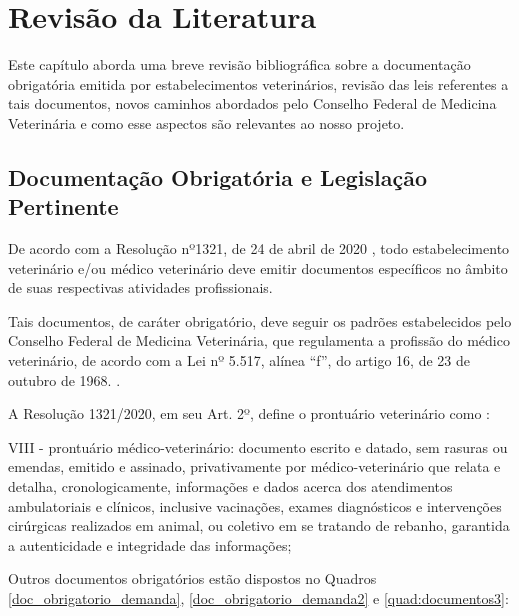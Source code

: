 \documentclass[
    12pt,               %
    openright,          %
    oneside,
    a4paper,            %
    BIBLATEX,           %
    TODO,               %
    english,            %
    brazil              %
    ]{ifsp-spo-inf-ctds}
\begin{document}
\chapter[Revisão de Literatura]{Revisão da Literatura} \label{revisao_lit}

    Este capítulo aborda uma breve revisão bibliográfica sobre a documentação obrigatória emitida por estabelecimentos veterinários, revisão das leis referentes a tais documentos, novos caminhos abordados pelo Conselho Federal de Medicina Veterinária e como esse aspectos são relevantes ao nosso projeto.


    \section{Documentação Obrigatória e Legislação Pertinente}
    
        De acordo com a Resolução nº1321, de 24 de abril de 2020 , todo estabelecimento veterinário e/ou médico veterinário deve emitir documentos específicos no âmbito de suas respectivas atividades profissionais.
        
        Tais documentos, de caráter obrigatório, deve seguir os padrões estabelecidos pelo Conselho Federal de Medicina Veterinária, que regulamenta a profissão do médico veterinário, de acordo com a Lei nº 5.517, alínea “f”, do artigo 16, de 23 de outubro de 1968. .
        
        A Resolução 1321/2020, em seu Art. 2º, define o prontuário veterinário como : 
    
        \begin{citacao}
            
        
            VIII - prontuário médico-veterinário: documento escrito e datado, sem rasuras ou emendas, emitido e assinado, privativamente por médico-veterinário que relata e detalha, cronologicamente, informações e dados acerca dos atendimentos ambulatoriais e clínicos, inclusive vacinações, exames diagnósticos e intervenções cirúrgicas realizados em animal, ou coletivo em se tratando de rebanho, garantida a autenticidade e integridade das informações;
        \end{citacao}
    
        Outros documentos obrigatórios estão dispostos no Quadros \ref{doc_obrigatorio_demanda}, \ref{doc_obrigatorio_demanda2} e \ref{quad:documentos3}: 
\end{document}
